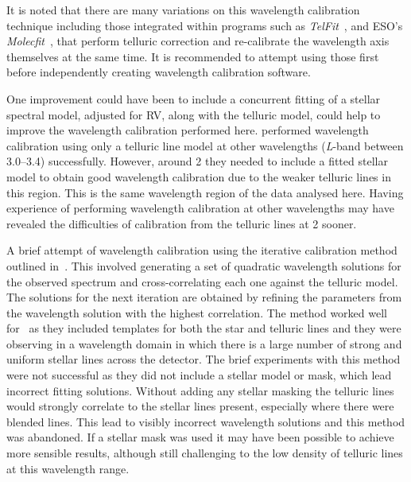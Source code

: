 It is noted that there are many variations on this wavelength calibration technique including those integrated within programs such as \emph{TelFit}~\citet{gullikson_correcting_2014}, and {ESO}'s \emph{Molecfit}~\citet{smette_molecfit_2015}, that perform telluric correction and re-calibrate the wavelength axis themselves at the same time.
It is recommended to attempt using those first before independently creating wavelength calibration software.

One improvement could have been to include a concurrent fitting of a stellar spectral model, adjusted for {RV}, along with the telluric model, could help to improve the wavelength calibration performed here.
\citet{piskorz_evidence_2016} performed wavelength calibration using only a telluric line model at other \nir{} wavelengths (\emph{L}-band between 3.0--3.4\um{}) successfully.
However, around 2\um{} they needed to include a fitted stellar model to obtain good wavelength calibration due to the weaker telluric lines in this region.
This is the same wavelength region of the data analysed here.
Having experience of performing wavelength calibration at other wavelengths may have revealed the difficulties of calibration from the telluric lines at 2\um{} sooner.

A brief attempt of wavelength calibration using the iterative calibration method outlined in~\cite{brogi_rotation_2016}.
This involved generating a set of quadratic wavelength solutions for the observed spectrum and cross-correlating each one against the telluric model.
The solutions for the next iteration are obtained by refining the parameters from the wavelength solution with the highest correlation.
The method worked well for~\citet{brogi_rotation_2016} as they included templates for both the star and telluric lines and they were observing in a wavelength domain in which there is a large number of strong and uniform stellar  lines across the detector.
The brief experiments with this method were not successful as they did not include a stellar model or mask, which lead incorrect fitting solutions.
Without adding any stellar masking the telluric lines would strongly correlate to the stellar lines present, especially where there were blended lines.
This lead to visibly incorrect wavelength solutions and this method was abandoned.
If a stellar mask was used it may have been possible to achieve more sensible results, although still challenging to the low density of telluric lines at this wavelength range.


